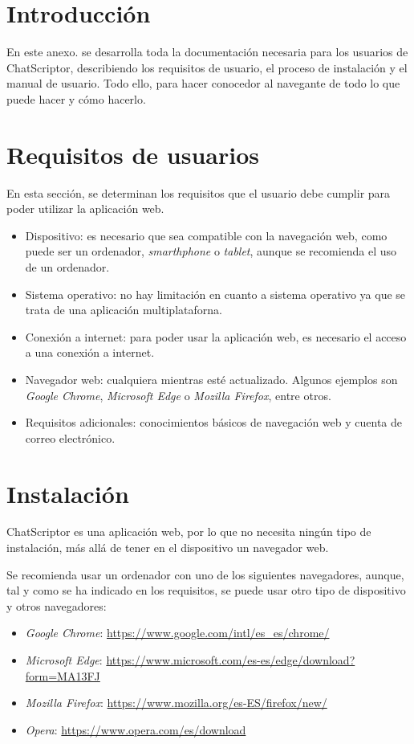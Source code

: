 \section{Introducción}
En este anexo. se desarrolla toda la documentación necesaria para los usuarios de ChatScriptor, describiendo los requisitos de usuario, el proceso de instalación y el manual de usuario. Todo ello, para hacer conocedor al navegante de todo lo que puede hacer y cómo hacerlo.

\section{Requisitos de usuarios}
En esta sección, se determinan los requisitos que el usuario debe cumplir para poder utilizar la aplicación web.
\begin{itemize}
    \item Dispositivo: es necesario que sea compatible con la navegación web, como puede ser un ordenador, \textit{smarthphone} o \textit{tablet}, aunque se recomienda el uso de un ordenador.
    \item Sistema operativo: no hay limitación en cuanto a sistema operativo ya que se trata de una aplicación multiplataforna.
    \item Conexión a internet: para poder usar la aplicación web, es necesario el acceso a una conexión a internet.
    \item Navegador web: cualquiera mientras esté actualizado. Algunos ejemplos son \textit{Google Chrome}, \textit{Microsoft Edge} o \textit{Mozilla Firefox}, entre otros.
    \item Requisitos adicionales: conocimientos básicos de navegación web y cuenta de correo electrónico.
\end{itemize}

\section{Instalación}
ChatScriptor es una aplicación web, por lo que no necesita ningún tipo de instalación, más allá de tener en el dispositivo un navegador web.

Se recomienda usar un ordenador con uno de los siguientes navegadores, aunque, tal y como se ha indicado en los requisitos, se puede usar otro tipo de dispositivo y otros navegadores:
\begin{itemize}
    \item \textit{Google Chrome}: \url{https://www.google.com/intl/es_es/chrome/}
    \item \textit{Microsoft Edge}: \url{https://www.microsoft.com/es-es/edge/download?form=MA13FJ}
    \item \textit{Mozilla Firefox}: \url{https://www.mozilla.org/es-ES/firefox/new/}
    \item \textit{Opera}: \url{https://www.opera.com/es/download}
\end{itemize}


